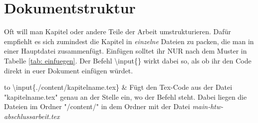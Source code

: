 \section{Dokumentstruktur}%
Oft will man Kapitel oder andere Teile der Arbeit umstrukturieren. Dafür empfiehlt es sich zumindest die Kapitel in \emph{einzelne} Dateien zu packen, die man in einer Hauptdatei zusammenfügt. Einfügen solltet ihr \textsc{NUR} nach dem Muster in Tabelle \ref{tab: einfuegen}. Der Befehl \textbackslash input\{\} wirkt dabei so, als ob ihr den Code direkt in euer Dokument einfügen würdet.%
\begin{table}[h]%
\begin{tabu} to \textwidth {X[c]X[c]}%
\toprule%
\textbackslash input\{./content/kapitelname.tex\} & Fügt den Tex-Code aus der Datei "kapitelname.tex" genau an der Stelle ein, wo der Befehl steht. Dabei liegen die Dateien im Ordner "/content/" in dem Ordner mit der Datei \emph{main-htw-abschlussarbeit.tex}\\%
\bottomrule%
\end{tabu}%
\caption{Dokumentstruktur durch Einfügen}%
\label{tab: einfuegen}%
\end{table}%
%
%
